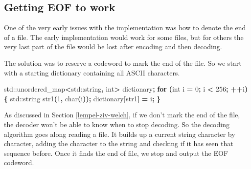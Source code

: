 \documentclass[12pt,twoside]{reedthesis}
\newenvironment{Shaded}{\begin{snugshade}}{\end{snugshade}}
\newcommand{\BuiltInTok}[1]{#1}
\newcommand{\ControlFlowTok}[1]{\textcolor[rgb]{0.13,0.29,0.53}{\textbf{#1}}}
\newcommand{\DataTypeTok}[1]{\textcolor[rgb]{0.13,0.29,0.53}{#1}}
\newcommand{\DecValTok}[1]{\textcolor[rgb]{0.00,0.00,0.81}{#1}}
\newcommand{\NormalTok}[1]{#1}
\newcommand{\OperatorTok}[1]{\textcolor[rgb]{0.81,0.36,0.00}{\textbf{#1}}}
\begin{document}
\hypertarget{getting-eof-to-work}{%
\subsection{Getting EOF to work}\label{getting-eof-to-work}}

One of the very early issues with the implementation was how to denote the end of a file. The early implementation would work for some files, but for others the very last part of the file would be lost after encoding and then decoding.

The solution was to reserve a codeword to mark the end of the file. So we start with a starting dictionary containing all ASCII characters.
\begin{Shaded}
\begin{Highlighting}[]
    \BuiltInTok{std::}\NormalTok{unordered\_map}\OperatorTok{\textless{}}\BuiltInTok{std::}\NormalTok{string}\OperatorTok{,} \DataTypeTok{int}\OperatorTok{\textgreater{}}\NormalTok{ dictionary}\OperatorTok{;}
    \ControlFlowTok{for} \OperatorTok{(}\DataTypeTok{int}\NormalTok{ i }\OperatorTok{=} \DecValTok{0}\OperatorTok{;}\NormalTok{ i }\OperatorTok{\textless{}} \DecValTok{256}\OperatorTok{;} \OperatorTok{++}\NormalTok{i}\OperatorTok{)\{}
        \BuiltInTok{std::}\NormalTok{string}\OperatorTok{ }\NormalTok{str1}\OperatorTok{(}\DecValTok{1}\OperatorTok{,} \DataTypeTok{char}\OperatorTok{(}\NormalTok{i}\OperatorTok{));}
\NormalTok{        dictionary}\OperatorTok{[}\NormalTok{str1}\OperatorTok{]} \OperatorTok{=}\NormalTok{ i}\OperatorTok{;}
    \OperatorTok{\}}
\end{Highlighting}
\end{Shaded}
As discussed in Section \ref{lempel-ziv-welch}, if we don't mark the end of the file, the decoder won't be able to know when to stop decoding. So the decoding algorithm goes along reading a file. It builds up a current string character by character, adding the character to the string and checking if it has seen that sequence before. Once it finds the end of file, we stop and output the EOF codeword.
\end{document}
